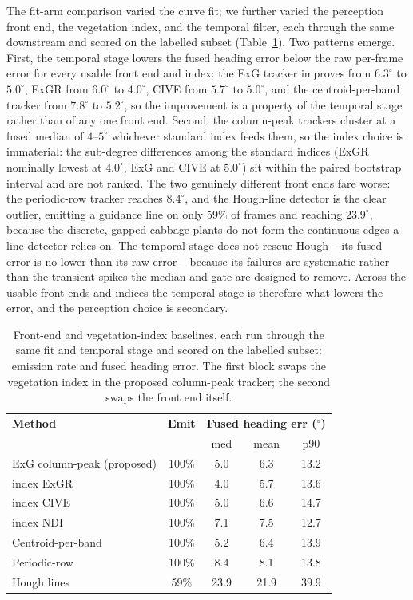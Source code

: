 The fit-arm comparison varied the curve fit; we further varied the perception
front end, the vegetation index, and the temporal filter, each through the same
downstream and scored on the labelled subset (Table~\ref{tab:res-frontend}). Two
patterns emerge. First, the temporal stage lowers the fused heading error below
the raw per-frame error for every usable front end and index: the ExG tracker
improves from $6.3^\circ$ to $5.0^\circ$, ExGR from $6.0^\circ$ to $4.0^\circ$,
CIVE from $5.7^\circ$ to $5.0^\circ$, and the centroid-per-band tracker from
$7.8^\circ$ to $5.2^\circ$, so the improvement is a property of the temporal stage
rather than of any one front end. Second, the column-peak trackers cluster at a
fused median of $4$--$5^\circ$ whichever standard index feeds them, so the index
choice is immaterial: the sub-degree differences among the standard indices (ExGR
nominally lowest at $4.0^\circ$, ExG and CIVE at $5.0^\circ$) sit within the paired
bootstrap interval and are not ranked. The two
genuinely different front ends fare worse: the periodic-row tracker reaches
$8.4^\circ$, and the Hough-line detector is the clear outlier, emitting a guidance
line on only $59\%$ of frames and reaching $23.9^\circ$, because the discrete,
gapped cabbage plants do not form the continuous edges a line detector relies on.
The temporal stage does not rescue Hough -- its fused error is no lower than its
raw error -- because its failures are systematic rather than the transient spikes
the median and gate are designed to remove. Across the usable front ends and
indices the temporal stage is therefore what lowers the error, and the perception
choice is secondary.

{\renewcommand{\arraystretch}{1.2}
\begin{table}[!ht]
  \centering
  \caption{Front-end and vegetation-index baselines, each run through the same fit
    and temporal stage and scored on the labelled subset: emission rate and
    fused heading error. The first block swaps the vegetation index in
    the proposed column-peak tracker; the second swaps the front end itself.}
  \label{tab:res-frontend}
  \begin{tabular}{lcccc}
    \hline
    \textbf{Method} & \textbf{Emit} & \multicolumn{3}{c}{\textbf{Fused heading err ($^\circ$)}} \\
                    &               & med & mean & p90 \\
    \hline
    ExG column-peak (proposed) & 100\% & 5.0 & 6.3  & 13.2 \\
    \quad index ExGR           & 100\% & 4.0 & 5.7  & 13.6 \\
    \quad index CIVE           & 100\% & 5.0 & 6.6  & 14.7 \\
    \quad index NDI            & 100\% & 7.1 & 7.5  & 12.7 \\
    \hline
    Centroid-per-band          & 100\% & 5.2 & 6.4  & 13.9 \\
    Periodic-row               & 100\% & 8.4 & 8.1  & 13.8 \\
    Hough lines                & 59\%  & 23.9 & 21.9 & 39.9 \\
    \hline
  \end{tabular}
\end{table}}

